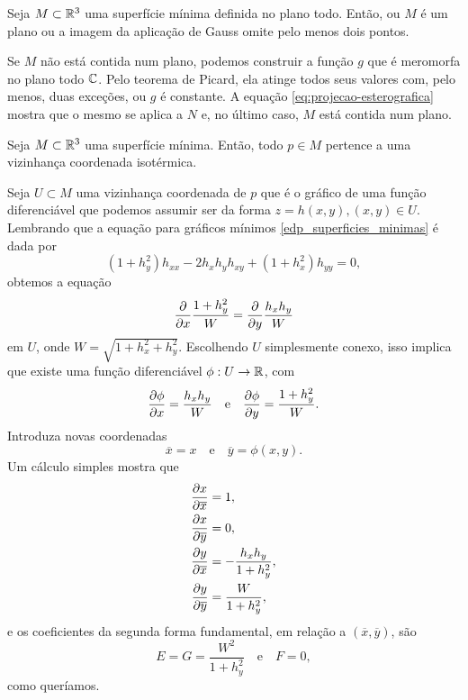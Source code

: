 \begin{corolario}
	Seja $M \subset \mathbb{R}^3$ uma superfície mínima definida no plano todo. Então, ou $M$ é um plano ou a imagem da aplicação de Gauss omite pelo menos dois pontos.
\end{corolario}

\begin{demonstracao}
	Se $M$ não está contida num plano, podemos construir a função $g$ que é meromorfa no plano todo $\mathbb{C}$. Pelo teorema de Picard, ela atinge todos seus valores com, pelo menos, duas exceções, ou $g$ é constante. A equação \eqref{eq:projecao-esterografica} mostra que o mesmo se aplica a $N$ e, no último caso, $M$ está contida num plano.
\end{demonstracao}

\begin{teorema}
	Seja $M \subset \mathbb{R}^3$ uma superfície mínima. Então, todo $p \in M$ pertence a uma vizinhança coordenada isotérmica.
\end{teorema}

\begin{demonstracao}
	Seja $U \subset M$ uma vizinhança coordenada de $p$ que é o gráfico de uma função diferenciável que podemos assumir ser da forma $z = h(x,y), (x,y) \in U$.
	Lembrando que a equação para gráficos mínimos \eqref{edp_superficies_minimas}  é dada por
	\begin{equation*}
	(1 + h_y^2) h_{xx} - 2 h_x h_y h_{xy} + (1 + h_x^2) h_{yy} = 0,
	\end{equation*}
	obtemos a equação
	\begin{equation*}
	\frac{\partial}{\partial x} \frac{1 + h_y^2}{W} = \frac{\partial}{\partial y} \frac{h_x h_y}{W}
	\end{equation*}
	em $U$, onde $W = \sqrt{1 + h_x^2 + h_y^2}$. Escolhendo $U$ simplesmente conexo, isso implica que existe uma função diferenciável $\phi: U \rightarrow \mathbb{R}$, com
	\begin{equation*}
	\frac{\partial \phi}{\partial x} = \frac{h_x h_y}{W} \quad \text{e} \quad
	\frac{\partial \phi}{\partial y} = \frac{1 + h_y^2}{W}.
	\end{equation*}
	Introduza novas coordenadas
	\begin{equation*}
	\overline{x} = x \quad \text{e} \quad
	\overline{y} = \phi(x,y).
	\end{equation*}
	Um cálculo simples mostra que
	\begin{align*}
	\frac{\partial x}{\partial \overline{x}} &= 1, \\
	\frac{\partial x}{\partial \overline{y}} &= 0, \\
	\frac{\partial y}{\partial \overline{x}} &= -\frac{h_x h_y}{1 + h_y^2}, \\
	\frac{\partial y}{\partial \overline{y}} &= \frac{W}{1 + h_y^2},
	\end{align*}
	e os coeficientes da segunda forma fundamental, em relação a $(\overline{x}, \overline{y})$, são
	\begin{equation*}
	E = G = \frac{W^2}{1 + h_y^2} \quad \text{e} \quad
	F = 0,
	\end{equation*}
	como queríamos.
\end{demonstracao}

